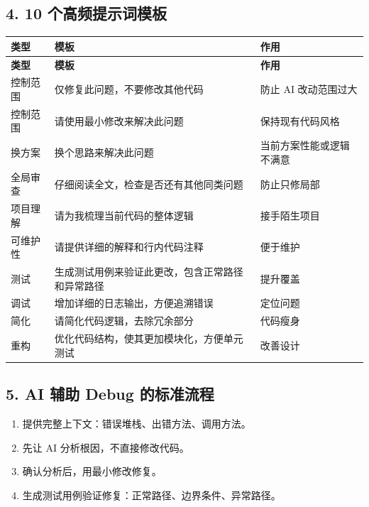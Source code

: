 \documentclass[UTF8,zihao=-4]{ctexart}
\begin{document}
\subsection{4. 10 个高频提示词模板}

{
\footnotesize
\begin{longtable}{|>{\raggedright\arraybackslash}p{}|>{\raggedright\arraybackslash}p{}|>{\raggedright\arraybackslash}p{}|}
\hline
\textbf{类型} & \textbf{模板} & \textbf{作用} \\
\hline
\endfirsthead
\hline
\textbf{类型} & \textbf{模板} & \textbf{作用} \\
\hline
\endhead
控制范围 & 仅修复此问题，不要修改其他代码 & 防止 AI 改动范围过大 \\
\hline
控制范围 & 请使用最小修改来解决此问题 & 保持现有代码风格 \\
\hline
换方案 & 换个思路来解决此问题 & 当前方案性能或逻辑不满意 \\
\hline
全局审查 & 仔细阅读全文，检查是否还有其他同类问题 & 防止只修局部 \\
\hline
项目理解 & 请为我梳理当前代码的整体逻辑 & 接手陌生项目 \\
\hline
可维护性 & 请提供详细的解释和行内代码注释 & 便于维护 \\
\hline
测试 & 生成测试用例来验证此更改，包含正常路径和异常路径 & 提升覆盖 \\
\hline
调试 & 增加详细的日志输出，方便追溯错误 & 定位问题 \\
\hline
简化 & 请简化代码逻辑，去除冗余部分 & 代码瘦身 \\
\hline
重构 & 优化代码结构，使其更加模块化，方便单元测试 & 改善设计 \\
\hline
\end{longtable}
}


\subsection{5. AI 辅助 Debug 的标准流程}

\begin{enumerate}
\item 提供完整上下文：错误堆栈、出错方法、调用方法。
\item 先让 AI 分析根因，不直接修改代码。
\item 确认分析后，用最小修改修复。
\item 生成测试用例验证修复：正常路径、边界条件、异常路径。
\end{enumerate}
\end{document}
